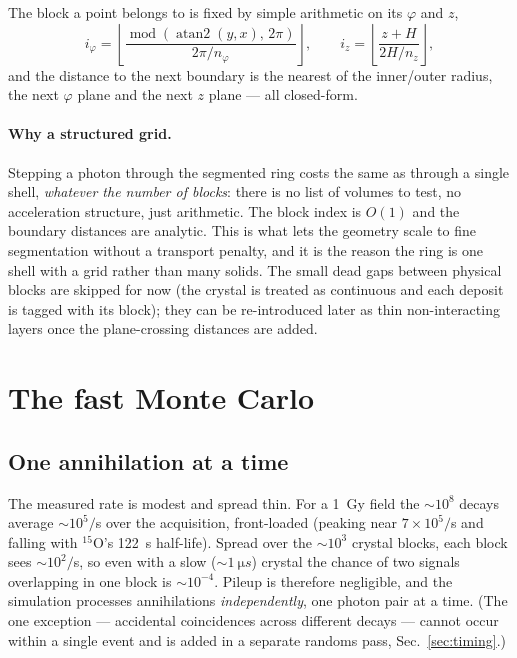 \documentclass[11pt]{article}
\begin{document}
The block a point belongs to is fixed by simple arithmetic on its $\varphi$ and $z$,
\begin{equation}
i_\varphi = \left\lfloor \frac{\operatorname{mod}(\operatorname{atan2}(y,x),\,2\pi)}{2\pi/n_\varphi}\right\rfloor,
\qquad
i_z = \left\lfloor \frac{z+H}{2H/n_z}\right\rfloor ,
\end{equation}
and the distance to the next boundary is the nearest of the inner/outer radius, the next
$\varphi$ plane and the next $z$ plane --- all closed-form.

\paragraph{Why a structured grid.}
Stepping a photon through the segmented ring costs the same as through a single shell,
\emph{whatever the number of blocks}: there is no list of volumes to test, no acceleration
structure, just arithmetic. The block index is $O(1)$ and the boundary distances are
analytic. This is what lets the geometry scale to fine segmentation without a transport
penalty, and it is the reason the ring is one shell with a grid rather than many solids. The
small dead gaps between physical blocks are skipped for now (the crystal is treated as
continuous and each deposit is tagged with its block); they can be re-introduced later as
thin non-interacting layers once the plane-crossing distances are added.

\section{The fast Monte Carlo}
\label{sec:mc}

\subsection{One annihilation at a time}
The measured rate is modest and spread thin. For a \SI{1}{Gy} field the $\sim 10^{8}$
decays average $\sim 10^{5}/$s over the acquisition, front-loaded (peaking near
$7\times10^{5}/$s and falling with $^{15}$O's \SI{122}{s} half-life). Spread over the
$\sim 10^{3}$ crystal blocks, each block sees $\sim 10^{2}/$s, so even with a slow
($\sim\SI{1}{\micro s}$) crystal the chance of two signals overlapping in one block is
$\sim 10^{-4}$. Pileup is therefore negligible, and the simulation processes annihilations
\emph{independently}, one photon pair at a time. (The one exception --- accidental
coincidences across different decays --- cannot occur within a single event and is added in
a separate randoms pass, Sec.~\ref{sec:timing}.)
\end{document}
